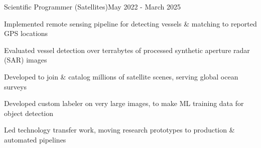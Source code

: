 \documentclass{article}
\newenvironment{**mylist}[2]{

\subsubsection*{#1\hfill#2}
  \small
  \begin{list}{}{}
    \setlength{\topsep}{0pt}
   \setlength{\itemsep}{1pt}
   \setlength{\parskip}{0pt}
   \setlength{\parsep}{0pt}}{\end{list}\normalsize}
\begin{document}
\begin{**mylist}{\href{https://globalfishingwatch.org/}{} \tabb Scientific Programmer (Satellites)}{May 2022 - March 2025}
\item Implemented remote sensing pipeline for detecting vessels \& matching to reported GPS locations
\item Evaluated vessel detection over terrabytes of processed synthetic aperture radar (SAR) images
\item Developed  to join \& catalog millions of satellite scenes, serving global ocean surveys
\item Developed custom labeler on very large images, to make ML training data for object detection
\item Led technology transfer work, moving research prototypes to production \& automated pipelines
\end{**mylist}
\end{document}
